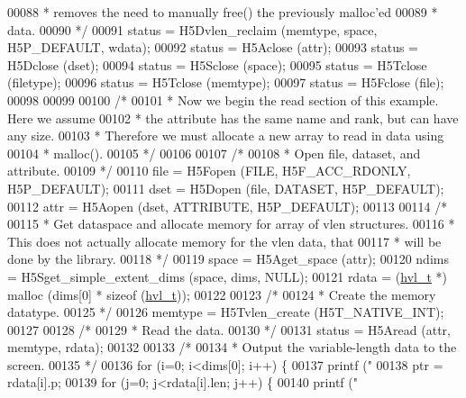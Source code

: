 \begin{DoxyCode}
00088 \textcolor{comment}{     * removes the need to manually free() the previously malloc'ed}
00089 \textcolor{comment}{     * data.}
00090 \textcolor{comment}{     */}
00091     status = H5Dvlen\_reclaim (memtype, space, H5P\_DEFAULT, wdata);
00092     status = H5Aclose (attr);
00093     status = H5Dclose (dset);
00094     status = H5Sclose (space);
00095     status = H5Tclose (filetype);
00096     status = H5Tclose (memtype);
00097     status = H5Fclose (file);
00098 
00099 
00100     \textcolor{comment}{/*}
00101 \textcolor{comment}{     * Now we begin the read section of this example.  Here we assume}
00102 \textcolor{comment}{     * the attribute has the same name and rank, but can have any size.}
00103 \textcolor{comment}{     * Therefore we must allocate a new array to read in data using}
00104 \textcolor{comment}{     * malloc().}
00105 \textcolor{comment}{     */}
00106 
00107     \textcolor{comment}{/*}
00108 \textcolor{comment}{     * Open file, dataset, and attribute.}
00109 \textcolor{comment}{     */}
00110     file = H5Fopen (FILE, H5F\_ACC\_RDONLY, H5P\_DEFAULT);
00111     dset = H5Dopen (file, DATASET, H5P\_DEFAULT);
00112     attr = H5Aopen (dset, ATTRIBUTE, H5P\_DEFAULT);
00113 
00114     \textcolor{comment}{/*}
00115 \textcolor{comment}{     * Get dataspace and allocate memory for array of vlen structures.}
00116 \textcolor{comment}{     * This does not actually allocate memory for the vlen data, that}
00117 \textcolor{comment}{     * will be done by the library.}
00118 \textcolor{comment}{     */}
00119     space = H5Aget\_space (attr);
00120     ndims = H5Sget\_simple\_extent\_dims (space, dims, NULL);
00121     rdata = (\hyperlink{structhvl__t}{hvl\_t} *) malloc (dims[0] * \textcolor{keyword}{sizeof} (\hyperlink{structhvl__t}{hvl\_t}));
00122 
00123     \textcolor{comment}{/*}
00124 \textcolor{comment}{     * Create the memory datatype.}
00125 \textcolor{comment}{     */}
00126     memtype = H5Tvlen\_create (H5T\_NATIVE\_INT);
00127 
00128     \textcolor{comment}{/*}
00129 \textcolor{comment}{     * Read the data.}
00130 \textcolor{comment}{     */}
00131     status = H5Aread (attr, memtype, rdata);
00132 
00133     \textcolor{comment}{/*}
00134 \textcolor{comment}{     * Output the variable-length data to the screen.}
00135 \textcolor{comment}{     */}
00136     \textcolor{keywordflow}{for} (i=0; i<dims[0]; i++) \{
00137         printf (\textcolor{stringliteral}{"%
00138         ptr = rdata[i].p;
00139         \textcolor{keywordflow}{for} (j=0; j<rdata[i].len; j++) \{
00140             printf (\textcolor{stringliteral}{" %
}}
\end{DoxyCode}
